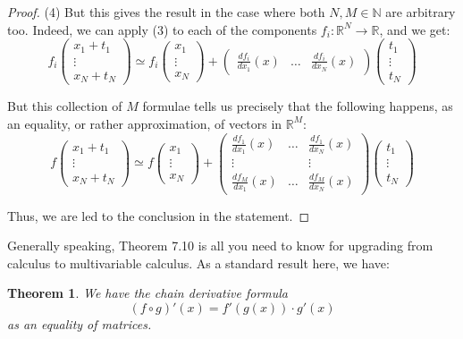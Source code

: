 \documentclass[12pt]{amsbook}
\newtheorem{theorem}{Theorem}[chapter]
\begin{document}
\begin{proof}
(4) But this gives the result in the case where both $N,M\in\mathbb N$ are arbitrary too. Indeed, we can apply (3) to each of the components $f_i:\mathbb R^N\to\mathbb R$, and we get:
$$f_i\begin{pmatrix}x_1+t_1\\ \vdots\\ x_N+t_N\end{pmatrix}
\simeq f_i\begin{pmatrix}x_1\\ \vdots\\ x_N\end{pmatrix}+
\begin{pmatrix}\frac{df_i}{dx_1}(x)&\ldots&\frac{df_i}{dx_N}(x)\end{pmatrix}
\begin{pmatrix}t_1\\ \vdots\\ t_N\end{pmatrix}$$

But this collection of $M$ formulae tells us precisely that the following happens, as an equality, or rather approximation, of vectors in $\mathbb R^M$:
$$f\begin{pmatrix}x_1+t_1\\ \vdots\\ x_N+t_N\end{pmatrix}
\simeq f\begin{pmatrix}x_1\\ \vdots\\ x_N\end{pmatrix}
+\begin{pmatrix}
\frac{df_1}{dx_1}(x)&\ldots&\frac{df_1}{dx_N}(x)\\
\vdots&&\vdots\\
\frac{df_M}{dx_1}(x)&\ldots&\frac{df_M}{dx_N}(x)
\end{pmatrix}\begin{pmatrix}t_1\\ \vdots\\ t_N\end{pmatrix}$$

Thus, we are led to the conclusion in the statement.
\end{proof}

Generally speaking, Theorem 7.10 is all you need to know for upgrading from calculus to multivariable calculus. As a standard result here, we have:

\begin{theorem}
We have the chain derivative formula
$$(f\circ g)'(x)=f'(g(x))\cdot g'(x)$$
as an equality of matrices.
\end{theorem}
\end{document}
